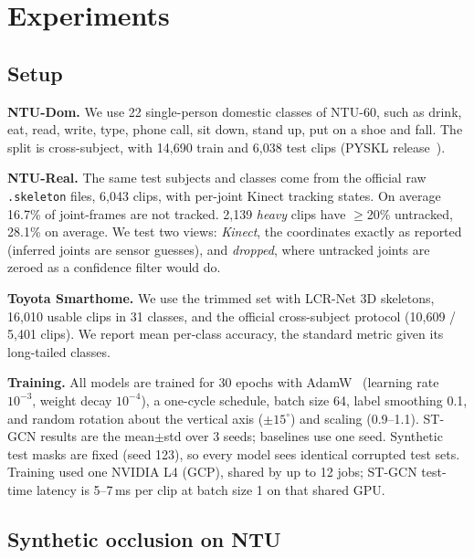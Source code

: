 \documentclass[11pt,twocolumn,letterpaper]{article}
\begin{document}
\section{Experiments}
\subsection{Setup}
\textbf{NTU-Dom.} We use 22 single-person domestic classes of NTU-60, such as drink, eat, read, write, type, phone call, sit down, stand up, put on a shoe and fall.
The split is cross-subject, with 14{,}690 train and 6{,}038 test clips (PYSKL release~\cite{duan2022pyskl}).

\textbf{NTU-Real.} The same test subjects and classes come from the official raw \texttt{.skeleton} files, 6{,}043 clips, with per-joint Kinect tracking states.
On average 16.7\% of joint-frames are not tracked.
2{,}139 \emph{heavy} clips have $\geq$20\% untracked, 28.1\% on average.
We test two views: \emph{Kinect}, the coordinates exactly as reported (inferred joints are sensor guesses), and \emph{dropped}, where untracked joints are zeroed as a confidence filter would do.

\textbf{Toyota Smarthome.} We use the trimmed set with LCR-Net 3D skeletons, 16{,}010 usable clips in 31 classes, and the official cross-subject protocol (10{,}609 / 5{,}401 clips).
We report mean per-class accuracy, the standard metric given its long-tailed classes.

\textbf{Training.} All models are trained for 30 epochs with AdamW~\cite{loshchilov2019adamw} (learning rate $10^{-3}$, weight decay $10^{-4}$), a one-cycle schedule, batch size 64, label smoothing 0.1, and random rotation about the vertical axis ($\pm15^\circ$) and scaling (0.9--1.1).
ST-GCN results are the mean$\pm$std over 3 seeds; baselines use one seed.
Synthetic test masks are fixed (seed 123), so every model sees identical corrupted test sets.
Training used one NVIDIA L4 (GCP), shared by up to 12 jobs; ST-GCN test-time latency is 5--7\,ms per clip at batch size 1 on that shared GPU.

\subsection{Synthetic occlusion on NTU}
\begin{table}[t]
\centering\footnotesize
\setlength{\tabcolsep}{3.2pt}

\caption{Top-1 accuracy (\%) on NTU-Dom (cross-subject, 6{,}038 test clips). ST-GCN rows: mean$\pm$std over 3 seeds; baselines: 1 seed.
``Furn.+N'': hidden joints hold their last observed position plus jitter instead of zero.
$^\dagger$Never seen in training by any scheme. $^\ddagger$Matches the training masks of the random-joint scheme only.}
\label{tab:ntu}
\end{table}
\end{document}
